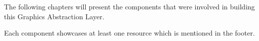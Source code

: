 












The following chapters will present the components that were involved in building this Graphics Abstraction Layer.


Each component showcases at least one resource which is mentioned in the footer.





















